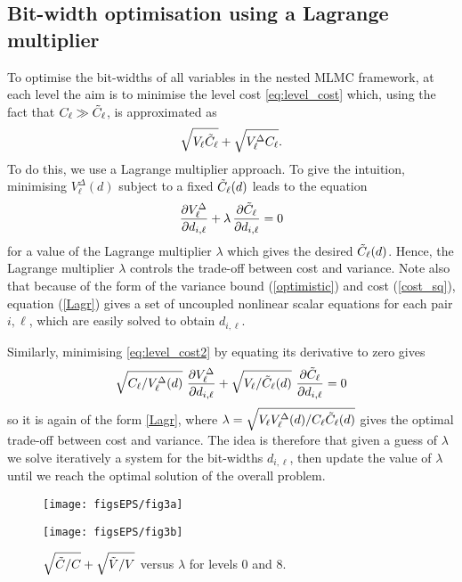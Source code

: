 \subsection{Bit-width optimisation using a Lagrange multiplier} 
To optimise the bit-widths of all variables in the nested MLMC framework, at each level the aim is to minimise the level cost \eqref{eq:level_cost} which, using the fact that $C_\ell \gg \Tilde{C}_\ell$, is approximated as
\begin{equation}\label{eq:level_cost2}
    \sqrt{V_\ell \Tilde{C}_\ell} + \sqrt{V^{\Delta}_\ell C_\ell}.
\end{equation}
To do this, we use a Lagrange multiplier approach. To give the intuition, minimising $V^{\Delta}_\ell(d)$ subject to a fixed $\Tilde{C}_\ell(d)$ leads to the equation
\begin{equation} \label{Lagr}
    \dfrac{\partial V^{\Delta}_\ell}{\partial d_{i,\ell}} +\lambda \, \dfrac{\partial \Tilde{C}_\ell}{\partial d_{i,\ell}} = 0
\end{equation}
for a value of the Lagrange multiplier $\lambda$ which gives the desired $\Tilde{C}_\ell(d)$. Hence, the Lagrange multiplier $\lambda$ controls the trade-off between cost and variance. 
Note also that because of the form of the variance bound (\ref{optimistic}) and cost (\ref{cost_sq}), equation (\ref{Lagr}) gives a set of uncoupled nonlinear scalar equations for each pair $i, \ell$, which are easily solved to obtain $d_{i,\ell}$.

Similarly, minimising \eqref{eq:level_cost2} by equating its derivative to zero gives 
\begin{equation}
    \sqrt{C_\ell/V^{\Delta}_\ell(d)}\ \dfrac{\partial V^{\Delta}_\ell}{\partial d_{i,\ell}} +\sqrt{V_\ell/\Tilde{C}_\ell(d)}\ \dfrac{\partial \Tilde{C}_\ell}{\partial d_{i,\ell}} = 0
\end{equation}
so it is again of the form \eqref{Lagr}, where $\lambda = \sqrt{V_\ell V_\ell^{\Delta}(d)/C_\ell \Tilde{C}_\ell(d)}$ gives the optimal trade-off between cost and variance. The idea is therefore that given a guess of $\lambda$ we solve iteratively a system for the bit-widths $d_{i,\ell}$, then update the value of $\lambda$ until we reach the optimal solution of the overall problem.

\begin{figure}
    \centering
    \begin{minipage}{.48\textwidth}
        \centering
        \texttt{[image: figsEPS/fig3a]}
    \end{minipage}
    \begin{minipage}{.48\textwidth}
        \centering
        \texttt{[image: figsEPS/fig3b]}
    \end{minipage}
    \caption{$\sqrt{\Tilde{C}/C}+ \sqrt{\Tilde{V}/V}$ versus $\lambda$ for levels 0 and 8.}   \label{fig:cost_lambda}
\end{figure}

